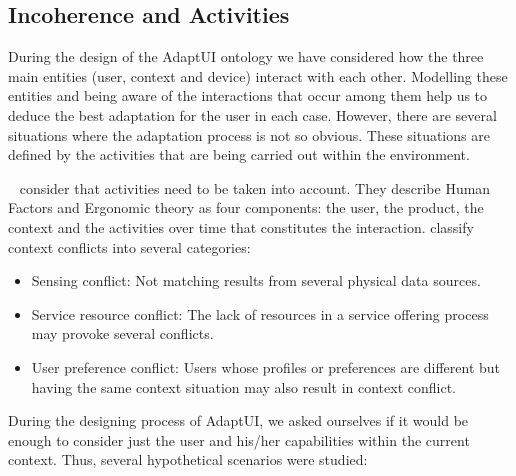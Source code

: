

\subsection{Incoherence and Activities}
\label{sec:incoherence}

During the design of the AdaptUI ontology we have considered how the three
main entities (user, context and device) interact with each other. Modelling
these entities and being aware of the interactions that occur among them help
us to deduce the best adaptation for the user in each case. However, there are
several situations where the adaptation process is not so obvious. These situations
are defined by the activities that are being carried out within the environment.

\citet{persad_characterising_2007}~\citep{persad_cognitive_2007}
consider that activities need to be taken into account. They describe Human
Factors and Ergonomic theory as four components: the user, the product, the context
and the activities over time that constitutes the interaction.
\citet{hong_context_aware_2009} classify context conflicts into several categories:

\begin{itemize}
 \item Sensing conflict: Not matching results from several physical data sources.
 
 \item Service resource conflict: The lack of resources in a service offering
 process may provoke several conflicts.
 
 \item User preference conflict: Users whose profiles or preferences are different
 but having the same context situation may also result in context conflict.
\end{itemize}

During the designing process of AdaptUI, we asked ourselves if it would be enough
to consider just the user and his/her capabilities within the current context.
Thus, several hypothetical scenarios were studied:

